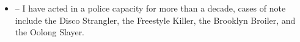 \begin{itemize}
    \item {} --
    I have acted in a police capacity for more than a decade, cases of note include the Disco Strangler, the Freestyle Killer, the Brooklyn Broiler, and the Oolong Slayer.
\end{itemize}